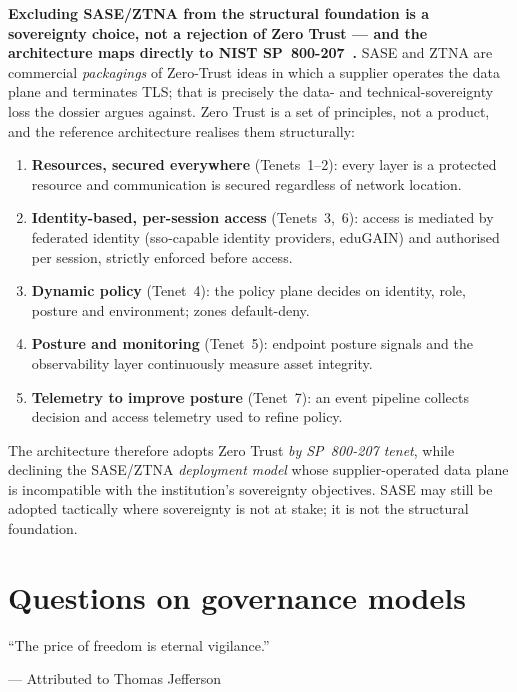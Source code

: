 \begin{answerbox}[Answer to Q1.5]
\textbf{Excluding SASE/ZTNA from the structural foundation is a sovereignty choice, not a rejection of Zero Trust --- and the architecture maps directly to NIST SP~800-207~\cite{nist-zt}.} SASE and ZTNA are commercial \emph{packagings} of Zero-Trust ideas in which a supplier operates the data plane and terminates TLS; that is precisely the data- and technical-sovereignty loss the dossier argues against. Zero Trust is a set of principles, not a product, and the reference architecture realises them structurally:
\begin{enumerate}[nosep]
  \item \textbf{Resources, secured everywhere} (Tenets~1--2): every layer is a protected resource and communication is secured regardless of network location.
  \item \textbf{Identity-based, per-session access} (Tenets~3,~6): access is mediated by federated identity (\gls{sso}-capable identity providers, eduGAIN) and authorised per session, strictly enforced before access.
  \item \textbf{Dynamic policy} (Tenet~4): the policy plane decides on identity, role, posture and environment; zones default-deny.
  \item \textbf{Posture and monitoring} (Tenet~5): endpoint posture signals and the observability layer continuously measure asset integrity.
  \item \textbf{Telemetry to improve posture} (Tenet~7): an event pipeline collects decision and access telemetry used to refine policy.
\end{enumerate}
\noindent The architecture therefore adopts Zero Trust \emph{by SP~800-207 tenet}, while declining the SASE/ZTNA \emph{deployment model} whose supplier-operated data plane is incompatible with the institution's sovereignty objectives. SASE may still be adopted tactically where sovereignty is not at stake; it is not the structural foundation.
\end{answerbox}

\section{Questions on governance models}
\label{sec:q-governance}

\epigraph{``The price of freedom is eternal vigilance.''}{--- Attributed to Thomas Jefferson}

